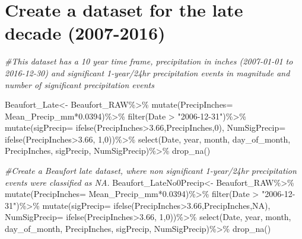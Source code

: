 \documentclass[
  12pt,
]{article}
\newenvironment{Shaded}{\begin{snugshade}}{\end{snugshade}}
\newcommand{\AttributeTok}[1]{\textcolor[rgb]{0.77,0.63,0.00}{#1}}
\newcommand{\CommentTok}[1]{\textcolor[rgb]{0.56,0.35,0.01}{\textit{#1}}}
\newcommand{\ConstantTok}[1]{\textcolor[rgb]{0.00,0.00,0.00}{#1}}
\newcommand{\DecValTok}[1]{\textcolor[rgb]{0.00,0.00,0.81}{#1}}
\newcommand{\FloatTok}[1]{\textcolor[rgb]{0.00,0.00,0.81}{#1}}
\newcommand{\FunctionTok}[1]{\textcolor[rgb]{0.00,0.00,0.00}{#1}}
\newcommand{\NormalTok}[1]{#1}
\newcommand{\OtherTok}[1]{\textcolor[rgb]{0.56,0.35,0.01}{#1}}
\newcommand{\SpecialCharTok}[1]{\textcolor[rgb]{0.00,0.00,0.00}{#1}}
\newcommand{\StringTok}[1]{\textcolor[rgb]{0.31,0.60,0.02}{#1}}
\begin{document}
\hypertarget{create-a-dataset-for-the-late-decade-2007-2016}{%
\section{Create a dataset for the late decade
(2007-2016)}\label{create-a-dataset-for-the-late-decade-2007-2016}}

\begin{Shaded}
\begin{Highlighting}[]
\CommentTok{\#This dataset has a 10 year time frame, precipitation in inches (2007{-}01{-}01 to 2016{-}12{-}30) and significant 1{-}year/24hr precipitation events in magnitude and number of significant precipitation events}

\NormalTok{Beaufort\_Late}\OtherTok{\textless{}{-}}\NormalTok{ Beaufort\_RAW}\SpecialCharTok{\%\textgreater{}\%}
  \FunctionTok{mutate}\NormalTok{(}\AttributeTok{PrecipInches=}\NormalTok{ Mean\_Precip\_mm}\SpecialCharTok{*}\FloatTok{0.0394}\NormalTok{)}\SpecialCharTok{\%\textgreater{}\%}
  \FunctionTok{filter}\NormalTok{(Date }\SpecialCharTok{\textgreater{}} \StringTok{"2006{-}12{-}31"}\NormalTok{)}\SpecialCharTok{\%\textgreater{}\%}
  \FunctionTok{mutate}\NormalTok{(}\AttributeTok{sigPrecip=} \FunctionTok{ifelse}\NormalTok{(PrecipInches}\SpecialCharTok{\textgreater{}}\FloatTok{3.66}\NormalTok{,PrecipInches,}\DecValTok{0}\NormalTok{),}
         \AttributeTok{NumSigPrecip=} \FunctionTok{ifelse}\NormalTok{(PrecipInches}\SpecialCharTok{\textgreater{}}\FloatTok{3.66}\NormalTok{, }\DecValTok{1}\NormalTok{,}\DecValTok{0}\NormalTok{))}\SpecialCharTok{\%\textgreater{}\%}
  \FunctionTok{select}\NormalTok{(Date, year, month, }
\NormalTok{         day\_of\_month, PrecipInches, sigPrecip, NumSigPrecip)}\SpecialCharTok{\%\textgreater{}\%}
  \FunctionTok{drop\_na}\NormalTok{()}

\CommentTok{\#Create a Beaufort late dataset, where non significant 1{-}year/24hr precipitation events were classified as NA.}
\NormalTok{Beaufort\_LateNo0Precip}\OtherTok{\textless{}{-}}\NormalTok{ Beaufort\_RAW}\SpecialCharTok{\%\textgreater{}\%}
  \FunctionTok{mutate}\NormalTok{(}\AttributeTok{PrecipInches=}\NormalTok{ Mean\_Precip\_mm}\SpecialCharTok{*}\FloatTok{0.0394}\NormalTok{)}\SpecialCharTok{\%\textgreater{}\%}
  \FunctionTok{filter}\NormalTok{(Date }\SpecialCharTok{\textgreater{}} \StringTok{"2006{-}12{-}31"}\NormalTok{)}\SpecialCharTok{\%\textgreater{}\%}
  \FunctionTok{mutate}\NormalTok{(}\AttributeTok{sigPrecip=} \FunctionTok{ifelse}\NormalTok{(PrecipInches}\SpecialCharTok{\textgreater{}}\FloatTok{3.66}\NormalTok{,PrecipInches,}\ConstantTok{NA}\NormalTok{),}
         \AttributeTok{NumSigPrecip=} \FunctionTok{ifelse}\NormalTok{(PrecipInches}\SpecialCharTok{\textgreater{}}\FloatTok{3.66}\NormalTok{, }\DecValTok{1}\NormalTok{,}\DecValTok{0}\NormalTok{))}\SpecialCharTok{\%\textgreater{}\%}
  \FunctionTok{select}\NormalTok{(Date, year, month, }
\NormalTok{         day\_of\_month, PrecipInches, sigPrecip, NumSigPrecip)}\SpecialCharTok{\%\textgreater{}\%}
  \FunctionTok{drop\_na}\NormalTok{()}


\end{Highlighting}
\end{Shaded}
\end{document}

